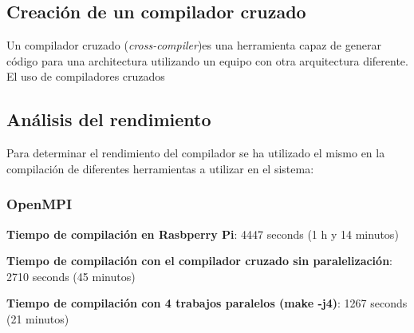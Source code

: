 \subsection{Creación de un compilador cruzado}

Un compilador cruzado (\textit{cross-compiler})es una herramienta capaz de generar código para una architectura utilizando un equipo con otra arquitectura diferente.%
El uso de compiladores cruzados 

\subsection{Análisis del rendimiento}

Para determinar el rendimiento del compilador se ha utilizado el mismo en la compilación de diferentes herramientas a utilizar en el sistema:

\subsubsection{OpenMPI}

\textbf{Tiempo de compilación en Rasbperry Pi}: 4447 seconds (1 h y 14 minutos)

\textbf{Tiempo de compilación con el compilador cruzado sin paralelización}: 2710 seconds (45 minutos)

\textbf{Tiempo de compilación con 4 trabajos paralelos (make -j4)}: 1267 seconds (21 minutos)